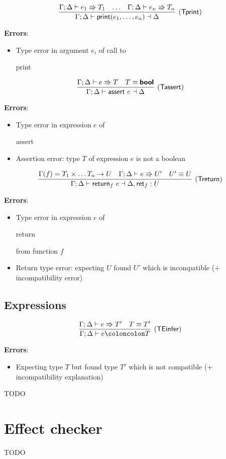 \documentclass[a4paper]{article}
\newcommand{\kw}[1]{\textsf{\textbf{#1}}}
\newcommand{\code}[1]{\begin{sffamily}#1\end{sffamily}}
\newcommand{\mcode}[1]{\mathsf{#1}}
\newcommand{\colcol}{\coloncolon}
\newcommand{\yield}{\Rrightarrow}
\newcommand{\fun}[1]{\mathsf{#1}}
\begin{document}
$$
\infer[(\fun{Tprint})]{\Gamma ; \Delta \vdash \mcode{print}(e_1,\ldots,e_n) \dashv \Delta}
{\Gamma;\Delta \vdash e_1 \yield T_1 & \ldots &  \Gamma;\Delta \vdash e_n \yield T_n}
$$

\textbf{Errors}:
\begin{itemize}
\item Type error in argument $e_i$ of call to \code{print}
\end{itemize}

$$
\infer[(\fun{Tassert})]{\Gamma ; \Delta \vdash \mcode{assert}~e \dashv \Delta}
{\Gamma;\Delta \vdash e \yield T & T \equiv \kw{bool}}
$$

\textbf{Errors}:
\begin{itemize}
\item Type error in expression $e$ of \code{assert}
\item Assertion error: type $T$ of expression $e$ is not a boolean
\end{itemize}

$$
\infer[(\fun{Treturn})]{\Gamma ; \Delta \vdash \mcode{return}_f~e \dashv \Delta,\fun{ret}_f:U}
{\Gamma(f)=T_1 \times \ldots T_n \rightarrow U & \Gamma;\Delta \vdash e \yield U' & U' \equiv U}
$$

\textbf{Errors}:
\begin{itemize}
\item Type error in expression $e$ of \code{return} from function $f$
\item Return type error: expecting $U$ found $U'$ which is incompatible (+ incompatibility error)
\end{itemize}


\subsection{Expressions}


$$
\infer[(\fun{TEinfer})]{\Gamma;\Delta \vdash e \colcol T}
{\Gamma;\Delta \vdash e \yield T' & T \equiv T'}
$$

\textbf{Errors}:
\begin{itemize}
\item Expecting type $T$ but found type $T'$ which is not compatible (+ incompatibility explanation)
\end{itemize}


TODO

\section{Effect checker}

TODO
\end{document}
